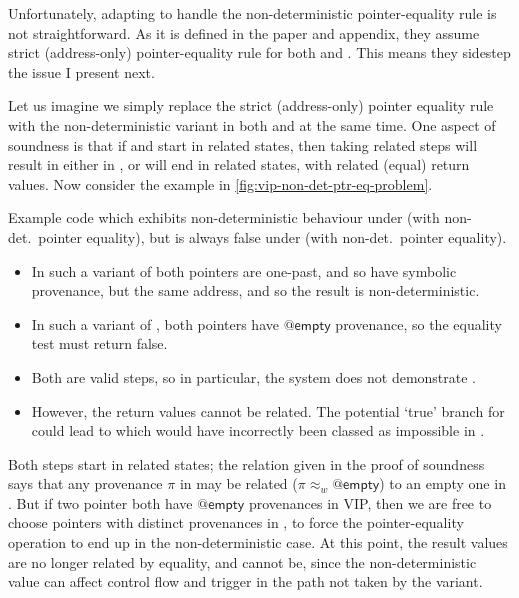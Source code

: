 Unfortunately, adapting  to handle the non-deterministic
pointer-equality rule is not straightforward. As it is defined in the paper and
appendix, they assume strict (address-only) pointer-equality rule for both
 and . This means they sidestep the issue I present
next.

Let us imagine we simply replace the strict (address-only) pointer equality
rule with the non-deterministic variant in both  and 
at the same time. One aspect of soundness is that if  and
 start in related states, then taking related steps will result in
either  in , or will end in related states, with related (equal)
return values. Now consider the example in \cref{fig:vip-non-det-ptr-eq-problem}.

\begin{marginfigure}
    \caption{Example code which exhibits non-deterministic behaviour under
         (with non-det.\ pointer equality), but is always false
        under  (with non-det.\ pointer equality).}\label{fig:vip-non-det-ptr-eq-problem}
\end{marginfigure}

\begin{itemize}
    \item In such a variant of  both pointers are one-past, and
        so have symbolic provenance, but the same address, and so the result is
        non-deterministic.
    \item In such a variant of , both pointers have $@\mathsf{empty}$
        provenance, so the equality test must return false.
    \item Both are valid steps, so in particular, the  system does not demonstrate .
    \item However, the return values cannot be related. The potential `true'
        branch for  could lead to  which would have
        incorrectly been classed as impossible in .
\end{itemize}

Both steps start in related states; the relation given in the proof of
soundness says that any provenance $\pi$ in  may be related
($\pi \approx_w @\mathsf{empty}$) to an empty one in . But if two
pointer both have $@\mathsf{empty}$ provenances in VIP, then we are free to
choose pointers with distinct provenances in , to force the
pointer-equality operation to end up in the non-deterministic case. At this
point, the result values are no longer related by equality, and cannot be,
since the non-deterministic value can affect control flow and trigger 
in the path not taken by the  variant.

